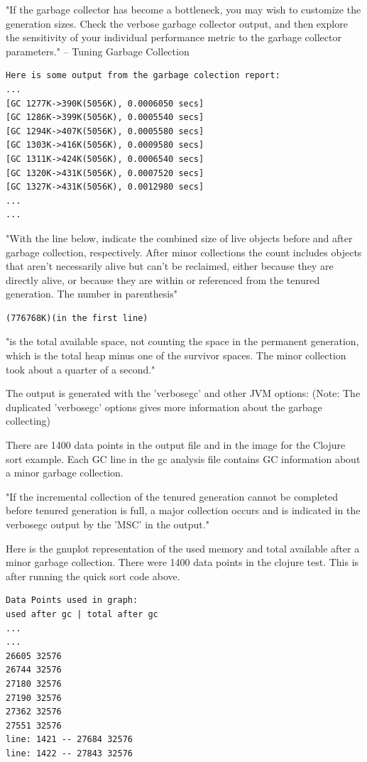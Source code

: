 "If the garbage collector has become a bottleneck, you may wish to customize the generation sizes. Check the verbose garbage collector output, and then explore the sensitivity of your individual performance metric to the garbage collector parameters." -- Tuning Garbage Collection

\begin{verbatim}
Here is some output from the garbage colection report:
...
[GC 1277K->390K(5056K), 0.0006050 secs]
[GC 1286K->399K(5056K), 0.0005540 secs]
[GC 1294K->407K(5056K), 0.0005580 secs]
[GC 1303K->416K(5056K), 0.0009580 secs]
[GC 1311K->424K(5056K), 0.0006540 secs]
[GC 1320K->431K(5056K), 0.0007520 secs]
[GC 1327K->431K(5056K), 0.0012980 secs]
...
...
\end{verbatim}

"With the line below, indicate the combined size of live objects before and after garbage collection, respectively. After minor collections the count includes objects that aren't necessarily alive but can't be reclaimed, either because they are directly alive, or because they are within or referenced from the tenured generation. The number in parenthesis"
\begin{verbatim}
(776768K)(in the first line)
\end{verbatim}
"is the total available space, not counting the space in the permanent generation, which is the total heap minus one of the survivor spaces. The minor collection took about a quarter of a second."

The output is generated with the 'verbosegc' and other JVM options:
(Note: The duplicated 'verbosegc' options gives more information about the garbage collecting)

There are 1400 data points in the output file and in the image for the Clojure sort example. Each GC line in the gc analysis file contains GC information about a minor garbage collection.

"If the incremental collection of the tenured generation cannot be completed before tenured generation is full, a major collection occurs and is indicated in the verbosegc output by the 'MSC' in the output."

Here is the gnuplot representation of the used memory and total available after a minor garbage collection. There were 1400 data points in the clojure test. This is after running the quick sort code above.
\begin{verbatim}
Data Points used in graph:
used after gc | total after gc
...
...
26605 32576
26744 32576
27180 32576
27190 32576
27362 32576
27551 32576
line: 1421 -- 27684 32576
line: 1422 -- 27843 32576
\end{verbatim}

